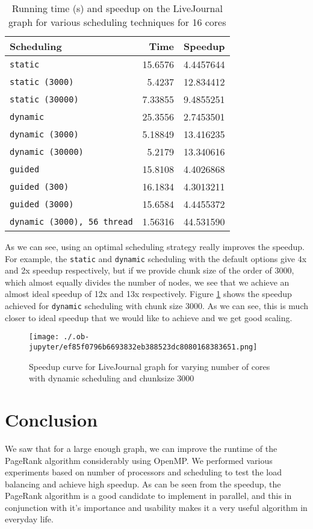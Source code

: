 \documentclass[11pt]{article}
\begin{document}
\begin{table}[htbp]
\caption{\label{tab:2}Running time (s) and speedup on the LiveJournal graph for various scheduling techniques for 16 cores}
\centering
\begin{tabular}{lrr}
\hline
Scheduling & Time & Speedup\\
\hline
\texttt{static} & 15.6576 & 4.4457644\\
\texttt{static (3000)} & 5.4237 & 12.834412\\
\texttt{static (30000)} & 7.33855 & 9.4855251\\
\texttt{dynamic} & 25.3556 & 2.7453501\\
\texttt{dynamic (3000)} & 5.18849 & 13.416235\\
\texttt{dynamic (30000)} & 5.2179 & 13.340616\\
\texttt{guided} & 15.8108 & 4.4026868\\
\texttt{guided (300)} & 16.1834 & 4.3013211\\
\texttt{guided (3000)} & 15.6584 & 4.4455372\\
\texttt{dynamic (3000), 56 thread} & 1.56316 & 44.531590\\
\hline
\end{tabular}
\end{table}

As we can see, using an optimal scheduling strategy really improves the speedup. For example, the \texttt{static} and \texttt{dynamic} scheduling with the default options give 4x and 2x speedup respectively, but if we provide chunk size of the order of 3000, which almost equally divides the number of nodes, we see that we achieve an almost ideal speedup of 12x and 13x respectively. Figure \ref{fig:speedup_dyn} shows the speedup achieved for \texttt{dynamic} scheduling with chunk size 3000. As we can see, this is much closer to ideal speedup that we would like to achieve and we get good scaling.

\begin{figure}[htbp]
\centering
\texttt{[image: ./.ob-jupyter/ef85f0796b6693832eb388523dc8080168383651.png]}
\caption{\label{fig:speedup_dyn}Speedup curve for LiveJournal graph for varying number of cores with dynamic scheduling and chunksize 3000}
\end{figure}

\section{Conclusion}
\label{sec:orgb3a789a}
We saw that for a large enough graph, we can improve the runtime of the PageRank algorithm considerably using OpenMP. We performed various experiments based on number of processors and scheduling to test the load balancing and achieve high speedup. As can be seen from the speedup, the PageRank algorithm is a good candidate to implement in parallel, and this in conjunction with it's importance and usability makes it a very useful algorithm in everyday life.
\end{document}
